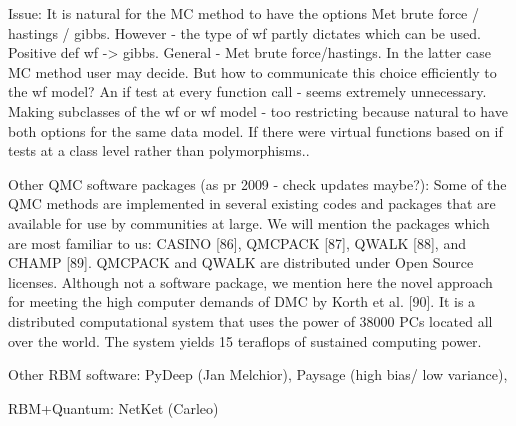 \documentclass[twoside,english]{uiofysmaster}
\begin{document}
Issue:
It is natural for the MC method to have the options Met brute force / hastings / gibbs. However - the type of wf partly dictates which can be used. Positive def wf -> gibbs. General - Met brute force/hastings. In the latter case MC method user may decide. But how to communicate this choice efficiently to the wf model? An if test at every function call - seems extremely unnecessary. Making subclasses of the wf or wf model - too restricting because natural to have both options for the same data model. If there were virtual functions based on if tests at a class level rather than polymorphisms..

Other QMC software packages (as pr 2009 - check updates maybe?):
Some of the QMC methods are implemented in several existing codes and packages that are available for use by communities at large. We will mention the packages which are most familiar to us: CASINO [86], QMCPACK [87], QWALK [88], and CHAMP [89]. QMCPACK and QWALK are distributed under Open Source licenses.
Although not a software package, we mention here the novel approach for meeting the high computer demands of DMC by Korth et al. [90]. It is a distributed computational system that uses the power of  38000 PCs located all over the world. The system yields  15 teraflops of sustained computing power.
\cite{Lester2009}

Other RBM software: PyDeep (Jan Melchior), Paysage (high bias/ low variance), 

RBM+Quantum: NetKet (Carleo)
\end{document}
